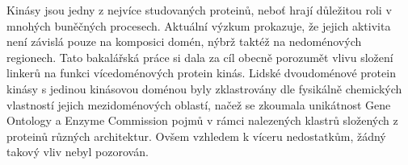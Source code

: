 \documentclass[12pt]{report}
\begin{document}
\ifEN
Kinásy jsou jedny z nejvíce studovaných proteinů, neboť hrají důležitou roli v mnohých
buněčných procesech.
Aktuální výzkum prokazuje, že jejich aktivita není závislá pouze na komposici domén, nýbrž
taktéž na nedoménových regionech.
Tato bakalářská práce si dala za cíl obecně porozumět vlivu složení linkerů na funkci
vícedoménových protein kinás.
Lidské dvoudoménové protein kinásy s jedinou kinásovou doménou byly zklastrovány dle
fysikálně chemických vlastností jejich mezidoménových oblastí, načež se zkoumala
unikátnost Gene Ontology a Enzyme Commission pojmů v rámci nalezených klastrů složených
z proteinů různých architektur.
Ovšem vzhledem k víceru nedostatkům, žádný takový vliv nebyl pozorován.
\else\Abstract\fi
\end{document}
